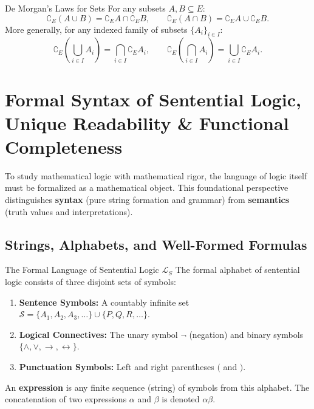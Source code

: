 \begin{theorembox}{De Morgan's Laws for Sets}
For any subsets $A, B \subseteq E$:
\begin{equation}
\complement_E (A \cup B) = \complement_E A \cap \complement_E B, \qquad \complement_E (A \cap B) = \complement_E A \cup \complement_E B.
\end{equation}
More generally, for any indexed family of subsets $\{A_i\}_{i \in I}$:
\begin{equation}
\complement_E \left( \bigcup_{i \in I} A_i \right) = \bigcap_{i \in I} \complement_E A_i, \qquad 
\complement_E \left( \bigcap_{i \in I} A_i \right) = \bigcup_{i \in I} \complement_E A_i.
\end{equation}
\end{theorembox}


\section{Formal Syntax of Sentential Logic, Unique Readability \& Functional Completeness}
\label{sec:sentential_formal_syntax}

To study mathematical logic with mathematical rigor, the language of logic itself must be formalized as a mathematical object. This foundational perspective distinguishes \textbf{syntax} (pure string formation and grammar) from \textbf{semantics} (truth values and interpretations).

\subsection{Strings, Alphabets, and Well-Formed Formulas}

\begin{definitionbox}{The Formal Language of Sentential Logic $\mathcal{L}_S$}
The formal alphabet of sentential logic consists of three disjoint sets of symbols:
\begin{enumerate}[leftmargin=1.4em,itemsep=2pt]
  \item \textbf{Sentence Symbols:} A countably infinite set $\mathcal{S} = \{A_1, A_2, A_3, \dots\} \cup \{P, Q, R, \dots\}$.
  \item \textbf{Logical Connectives:} The unary symbol $\neg$ (negation) and binary symbols $\{\land, \lor, \to, \leftrightarrow\}$.
  \item \textbf{Punctuation Symbols:} Left and right parentheses $($ and $)$.
\end{enumerate}
An \textbf{expression} is any finite sequence (string) of symbols from this alphabet. The concatenation of two expressions $\alpha$ and $\beta$ is denoted $\alpha\beta$.
\end{definitionbox}

